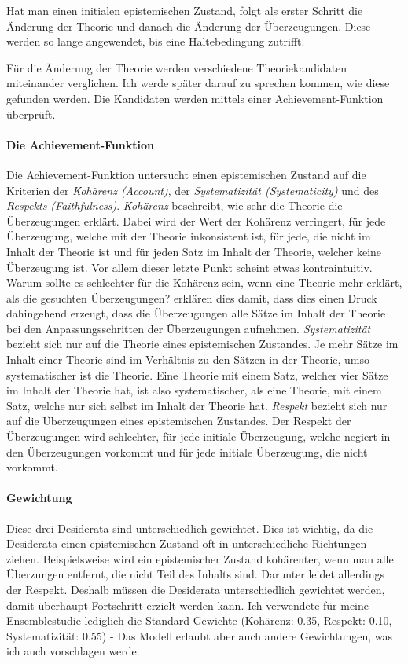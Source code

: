 \documentclass{article}
\begin{document}
Hat man einen initialen epistemischen Zustand, folgt als erster Schritt die Änderung der Theorie und danach die Änderung der Überzeugungen. Diese werden so lange angewendet, bis eine Haltebedingung zutrifft.\autocite[S.~449]{beisbart_making_2021}

Für die Änderung der Theorie werden verschiedene Theoriekandidaten miteinander verglichen. Ich werde später darauf zu sprechen kommen, wie diese gefunden werden. Die Kandidaten werden mittels einer Achievement-Funktion überprüft.

\paragraph{Die Achievement-Funktion} \label{achievement-funktion}
Die Achievement-Funktion untersucht einen epistemischen Zustand auf die Kriterien der \textit{Kohärenz (Account)}, der \textit{Systematizität (Systematicity)} und des \textit{Respekts (Faithfulness)}. \textit{Kohärenz} beschreibt, wie sehr die Theorie die Überzeugungen erklärt. Dabei wird der Wert der Kohärenz verringert, für jede Überzeugung, welche mit der Theorie inkonsistent ist, für jede, die nicht im Inhalt der Theorie ist und für jeden Satz im Inhalt der Theorie, welcher keine Überzeugung ist. Vor allem dieser letzte Punkt scheint etwas kontraintuitiv. Warum sollte es schlechter für die Kohärenz sein, wenn eine Theorie mehr erklärt, als die gesuchten Überzeugungen? \citeauthor{beisbart_making_2021} erklären dies damit, dass dies einen Druck dahingehend erzeugt, dass die Überzeugungen alle Sätze im Inhalt der Theorie bei den Anpassungsschritten der Überzeugungen aufnehmen.
\textit{Systematizität} bezieht sich nur auf die Theorie eines epistemischen Zustandes. Je mehr Sätze im Inhalt einer Theorie sind im Verhältnis zu den Sätzen in der Theorie, umso systematischer ist die Theorie. Eine Theorie mit einem Satz, welcher vier Sätze im Inhalt der Theorie hat, ist also systematischer, als eine Theorie, mit einem Satz, welche nur sich selbst im Inhalt der Theorie hat.
\textit{Respekt} bezieht sich nur auf die Überzeugungen eines epistemischen Zustandes. Der Respekt der Überzeugungen wird schlechter, für jede initiale Überzeugung, welche negiert in den Überzeugungen vorkommt und für jede initiale Überzeugung, die nicht vorkommt.

\paragraph{Gewichtung} Diese drei Desiderata sind unterschiedlich gewichtet. Dies ist wichtig, da die Desiderata einen epistemischen Zustand oft in unterschiedliche Richtungen ziehen. Beispielsweise wird ein epistemischer Zustand kohärenter, wenn man alle Überzungen entfernt, die nicht Teil des Inhalts sind. Darunter leidet allerdings der Respekt. Deshalb müssen die Desiderata unterschiedlich gewichtet werden, damit überhaupt Fortschritt erzielt werden kann. Ich verwendete für meine Ensemblestudie lediglich die Standard-Gewichte (Kohärenz: 0.35, Respekt: 0.10, Systematizität: 0.55) - Das Modell erlaubt aber auch andere Gewichtungen, was ich auch vorschlagen werde. \autocite[S.~448]{beisbart_making_2021}
\end{document}
